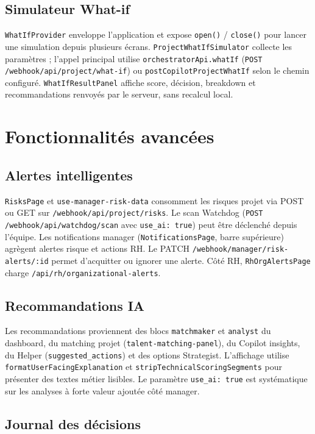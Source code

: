 \subsection{Simulateur What-if}

\texttt{WhatIfProvider} enveloppe l'application et expose \texttt{open()} / \texttt{close()} pour lancer une simulation depuis plusieurs écrans. \texttt{ProjectWhatIfSimulator} collecte les paramètres ; l'appel principal utilise \texttt{orchestratorApi.whatIf} (\texttt{POST /webhook/api/project/what-if}) ou \texttt{postCopilotProjectWhatIf} selon le chemin configuré. \texttt{WhatIfResultPanel} affiche score, décision, breakdown et recommandations renvoyés par le serveur, sans recalcul local.

\section{Fonctionnalités avancées}

\subsection{Alertes intelligentes}

\texttt{RisksPage} et \texttt{use-manager-risk-data} consomment les risques projet via POST ou GET sur \texttt{/webhook/api/project/risks}. Le scan Watchdog (\texttt{POST /webhook/api/watchdog/scan} avec \texttt{use\_ai: true}) peut être déclenché depuis l'équipe. Les notifications manager (\texttt{NotificationsPage}, barre supérieure) agrègent alertes risque et actions RH. Le PATCH \texttt{/webhook/manager/risk-alerts/:id} permet d'acquitter ou ignorer une alerte. Côté RH, \texttt{RhOrgAlertsPage} charge \texttt{/api/rh/organizational-alerts}.

\subsection{Recommandations IA}

Les recommandations proviennent des blocs \texttt{matchmaker} et \texttt{analyst} du dashboard, du matching projet (\texttt{talent-matching-panel}), du Copilot insights, du Helper (\texttt{suggested\_actions}) et des options Strategist. L'affichage utilise \texttt{formatUserFacingExplanation} et \texttt{stripTechnicalScoringSegments} pour présenter des textes métier lisibles. Le paramètre \texttt{use\_ai: true} est systématique sur les analyses à forte valeur ajoutée côté manager.

\subsection{Journal des décisions}

